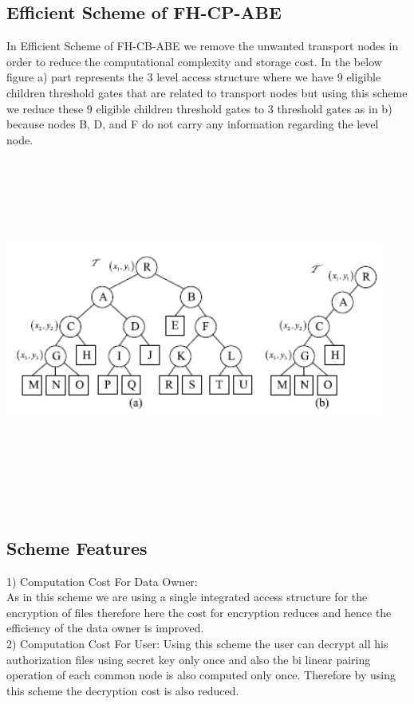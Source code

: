 \documentclass[a4paper,12pt]{article}
\begin{document}
\subsection{Efficient Scheme of FH-CP-ABE }
In Efficient Scheme of FH-CB-ABE we remove the unwanted transport nodes in order to reduce the computational complexity and storage cost. In the below figure a) part represents the 3 level access structure where we have 9 eligible children threshold gates that are related to transport nodes but using this scheme we reduce these 9 eligible children threshold gates to 3 threshold gates as in b) because nodes B, D, and F do not carry any information regarding the level node.\\
\includegraphics[width=12.5cm,height=12cm]{fig14.PNG}
\subsection{Scheme Features}
1) Computation Cost For Data Owner: \\
As in this scheme we are using a single integrated access structure for the encryption of files therefore here the cost for encryption reduces and hence the efficiency of the data owner is improved.\\
2) Computation Cost For User: Using this scheme the user can decrypt all his authorization files using secret key only once and also the bi linear pairing operation of each common node  is also computed only once. Therefore by using this scheme the decryption cost is also reduced.
\newpage
\end{document}
